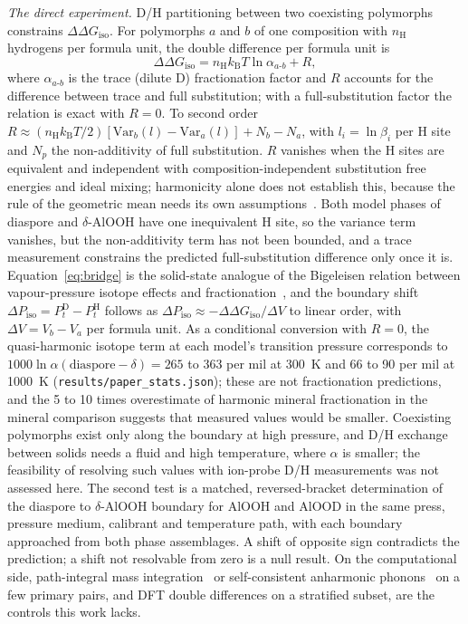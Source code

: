 \documentclass[aps,prmaterials,reprint,superscriptaddress,nofootinbib]{revtex4-2}
\newcommand{\ddG}{\Delta\Delta G_{\mathrm{iso}}}
\begin{document}
\textit{The direct experiment.} D/H partitioning between two coexisting polymorphs constrains $\ddG$. For polymorphs $a$ and $b$ of one composition with $n_{\mathrm{H}}$ hydrogens per formula unit, the double difference per formula unit is
\begin{equation}
\ddG = n_{\mathrm{H}} k_{\mathrm{B}} T \ln\alpha_{a\text{-}b} + R ,
\label{eq:bridge}
\end{equation}
where $\alpha_{a\text{-}b}$ is the trace (dilute D) fractionation factor and $R$ accounts for the difference between trace and full substitution; with a full-substitution factor the relation is exact with $R = 0$. To second order $R \approx (n_{\mathrm{H}}k_{\mathrm{B}}T/2)[\mathrm{Var}_b(l) - \mathrm{Var}_a(l)] + N_b - N_a$, with $l_i = \ln\beta_i$ per H site and $N_p$ the non-additivity of full substitution. $R$ vanishes when the H sites are equivalent and independent with composition-independent substitution free energies and ideal mixing; harmonicity alone does not establish this, because the rule of the geometric mean needs its own assumptions~\cite{Albery1969}. Both model phases of diaspore and $\delta$-AlOOH have one inequivalent H site, so the variance term vanishes, but the non-additivity term has not been bounded, and a trace measurement constrains the predicted full-substitution difference only once it is. Equation~\eqref{eq:bridge} is the solid-state analogue of the Bigeleisen relation between vapour-pressure isotope effects and fractionation~\cite{Bigeleisen1947}, and the boundary shift $\Delta P_{\mathrm{iso}} = P_t^{\mathrm{D}} - P_t^{\mathrm{H}}$ follows as $\Delta P_{\mathrm{iso}} \approx -\ddG/\Delta V$ to linear order, with $\Delta V = V_b - V_a$ per formula unit. As a conditional conversion with $R = 0$, the quasi-harmonic isotope term at each model's transition pressure corresponds to $1000\ln\alpha(\mathrm{diaspore} - \delta) = 265$ to 363 per mil at 300~K and 66 to 90 per mil at 1000~K (\texttt{results/paper\_stats.json}); these are not fractionation predictions, and the 5 to 10 times overestimate of harmonic mineral fractionation in the mineral comparison suggests that measured values would be smaller. Coexisting polymorphs exist only along the boundary at high pressure, and D/H exchange between solids needs a fluid and high temperature, where $\alpha$ is smaller; the feasibility of resolving such values with ion-probe D/H measurements was not assessed here. The second test is a matched, reversed-bracket determination of the diaspore to $\delta$-AlOOH boundary for AlOOH and AlOOD in the same press, pressure medium, calibrant and temperature path, with each boundary approached from both phase assemblages. A shift of opposite sign contradicts the prediction; a shift not resolvable from zero is a null result. On the computational side, path-integral mass integration~\cite{Ceriotti2013,Cheng2014} or self-consistent anharmonic phonons~\cite{Monacelli2021} on a few primary pairs, and DFT double differences on a stratified subset, are the controls this work lacks.
\end{document}
